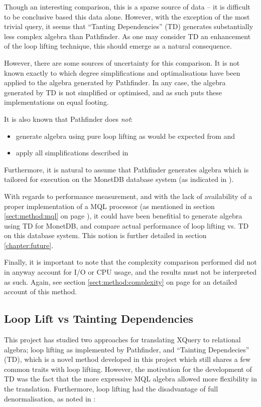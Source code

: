 Though an interesting comparison, this is a sparse source of data -- it
is difficult to be conclusive based this data alone. However, with the
exception of the most trivial query, it seems that ``Tanting Dependencies'' (TD)
generates substantially less complex algebra than Pathfinder. As one
may consider TD an enhancement of the loop lifting technique, this should
emerge as a natural consequence.

However, there are some sources of uncertainty for this comparison. It is not
known exactly to which degree simplifications and optimalisations have been
applied to the algebra generated by Pathfinder. In any case, the
algebra generated by TD is not simplified or optimised, and as such puts these
implementations on equal footing. 

It is also known that Pathfinder does \emph{not}:
\begin{itemize}
  \item generate algebra using pure loop lifting as would be expected from
  \cite{pathfinder_mothertongue} and \cite{pathfinder_purelyRelational}
  \item apply all simplifications described in
  \cite{pathfinder_purelyRelational}
\end{itemize}

Furthermore, it is natural to assume that Pathfinder generates algebra
which is tailored for execution on the MonetDB database system (as indicated
in \cite{pathfinder_purelyRelational}).

With regards to performance measurement, and with the lack of availability of a
proper implementation of a MQL processor (as mentioned in section
\ref{sect:method:mql} on page \pageref{sect:method:mql}), it could have been
benefitial to generate algebra using TD for MonetDB, and compare
actual performance of loop lifting vs. TD on this database system. This notion
is further detailed in section \ref{chapter:future}.

Finally, it is important to note that the complexity comparison performed did
not in anyway account for I/O or CPU usage, and the results must not be
interpreted as such. Again, see section \ref{sect:method:complexity} on
page \pageref{sect:method:complexity} for an detailed account of this method.

\subsection{Loop Lift vs Tainting Dependencies}
\label{sect:disc:llvsTD}
This project has studied two approaches for translating XQuery to relational
algebra; loop lifting as implemented by Pathfinder, and ``Tainting
Dependecies'' (TD), which is a novel method developed in this project which
still shares a few common traits with loop lifting. However, the motivation for
the development of TD was the fact that the more expressive MQL algebra allowed
more flexibility in the translation. Furthermore, loop lifting had the
disadvantage of full denormalisation, as noted in
\cite{pathfinder_purelyRelational}: 

